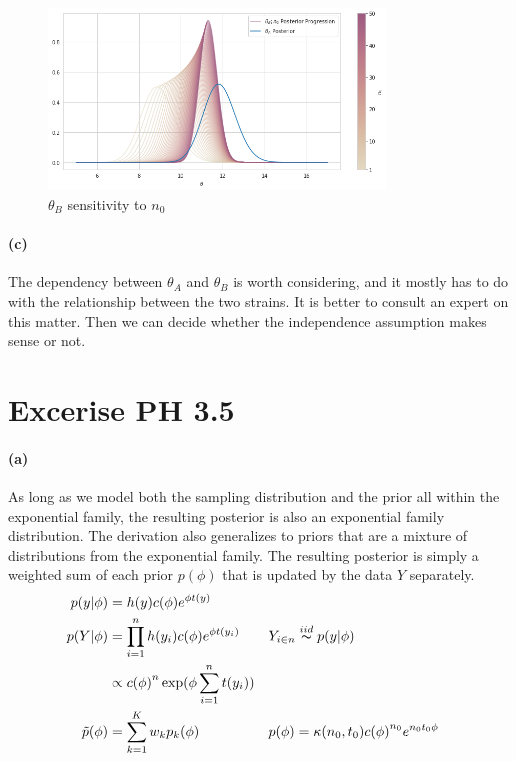 \documentclass[11pt, letterpaper]{article}
\begin{document}
\begin{figure}[!h]
  \centering
  \includegraphics[width=0.8\textwidth]{3.3.b.png}
  \captionsetup{justification=centering}
  \caption{$\theta_B$ sensitivity to $n_0$}
\end{figure}

\paragraph{(c)}
The dependency between $\theta_A$ and $\theta_B$ is worth considering, and it mostly has to do with the
relationship between the two strains. It is better to consult an expert on this matter. Then we can decide
whether the independence assumption makes sense or not. 
\newpage

\section{Excerise PH 3.5}
\paragraph{(a)}
As long as we model both the sampling distribution and the prior all within the exponential family, the resulting
posterior is also an exponential family distribution. The derivation also generalizes to priors that are
a mixture of distributions from the exponential family. The resulting posterior is simply a weighted sum
of each prior $p(\phi)$ that is updated by the data $Y$ separately.
\begin{align*}
  p(y|\phi) &= h(y)c(\phi)e^{\phi t(y)} \\
  p(Y|\phi) &= \prod_{i=1}^{n} h(y_i)c(\phi)e^{\phi t(y_i)} && Y_{i \in n} \overset{iid}{\thicksim} p(y|\phi) \\
    &\propto {c(\phi)}^{n} \exp(\phi \sum_{i=1}^{n} t(y_i)) \\
  \tilde{p}(\phi) &= \sum_{k=1}^{K} w_k p_k(\phi) && p(\phi) = \kappa(n_0, t_0) {c(\phi)}^{n_0} e^{n_0 t_0 \phi}
\end{align*}
\end{document}
